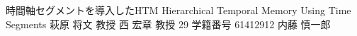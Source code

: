 \documentclass[final,a4j,12pt]{jreport}
\begin{document}
\begin{titlepage}
\thesis
{時間軸セグメントを導入したHTM}
{Hierarchical Temporal Memory Using Time Segments}
{萩原 将文 教授}
{西 宏章 教授}
{29}
{学籍番号 61412912}
{内藤 慎一郎}
\end{titlepage}

\contents



% 
% 
% 
% 
% 
% 
% 

% 
% 
% 


% 
% 
% 
\end{document}

